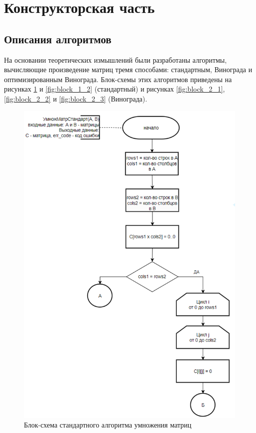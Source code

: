 \section{Конструкторская часть}
\subsection{Описания алгоритмов}

\hspace{1.25cm}
На основании теоретических измышлений были разработаны алгоритмы, вычисляющие произведение матриц тремя способами: стандартным, Винограда и оптимизированным Винограда. Блок-схемы этих алгоритмов приведены на рисунках \ref{fig:block_1_1} и \ref{fig:block_1_2} (стандартный) и рисунках \ref{fig:block_2_1}, \ref{fig:block_2_2} и \ref{fig:block_2_3} (Винограда).

\begin{figure}[H]
    \centering
    \includegraphics[width=1\textwidth]{img/block_1_1.png}
    \caption{Блок-схема стандартного алгоритма умножения матриц}
    \label{fig:block_1_1}
\end{figure}


